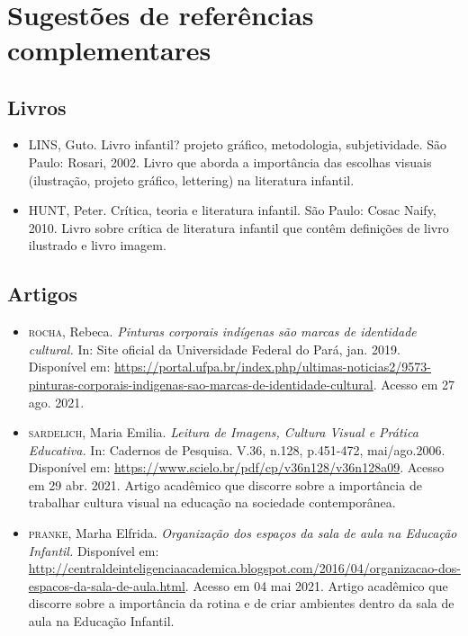 \documentclass[11pt]{extarticle}
\begin{document}
 
\section{Sugestões de referências complementares}

\subsection{Livros} 

\begin{itemize}
\item LINS, Guto. Livro infantil? projeto gráfico, metodologia, subjetividade. São Paulo: Rosari, 2002.
Livro que aborda a importância das escolhas visuais (ilustração, projeto gráfico, lettering) na literatura infantil.  

\item HUNT, Peter. Crítica, teoria e literatura infantil. São Paulo: Cosac Naify, 2010.
Livro sobre crítica de literatura infantil que contêm definições de livro ilustrado e livro imagem. 
\end{itemize}

\subsection{Artigos}

\begin{itemize}

	\item \textsc{rocha}, Rebeca. \emph{Pinturas corporais indígenas são marcas de identidade cultural.}
	In: Site oficial da Universidade Federal do Pará, jan. 2019. Disponível em: \url{https://portal.ufpa.br/index.php/ultimas-noticias2/9573-pinturas-corporais-indigenas-sao-marcas-de-identidade-cultural}. Acesso em 27 ago. 2021.
	
	\item \textsc{sardelich}, Maria Emilia. \emph{Leitura de Imagens, Cultura Visual e Prática Educativa.} 
In: Cadernos de Pesquisa. V.36, n.128, p.451-472, mai/ago.2006. Disponível em: \url{https://www.scielo.br/pdf/cp/v36n128/v36n128a09}. 
Acesso em 29 abr. 2021. 
Artigo acadêmico que discorre sobre a importância de trabalhar cultura 
visual na educação na sociedade contemporânea. 

\item \textsc{pranke}, Marha Elfrida. \emph{Organização dos espaços da sala de aula na Educação Infantil.} Disponível em: 
\url{http://centraldeinteligenciaacademica.blogspot.com/2016/04/organizacao-dos-espacos-da-sala-de-aula.html}. Acesso em 04 mai 2021. 
Artigo acadêmico que discorre sobre a importância da rotina e de criar ambientes dentro da sala de aula na Educação Infantil.  
\end{itemize}
\end{document}
